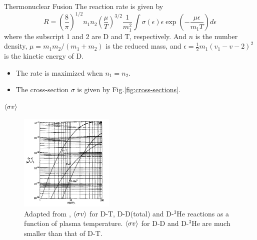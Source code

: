\begin{frame}{Thermonuclear Fusion}
	The reaction rate is given by
	\begin{equation}
		R = \left(\frac{8}{\pi}\right)^{1/2}n_1n_2\left(\frac{\mu}{T}\right)^{3/2}\frac{1}{m_1^2}\int \sigma(\epsilon)\epsilon\exp(-\frac{\mu\epsilon}{m_1T})d\epsilon
		\label{eq:reaction-rate}
	\end{equation}
	where the subscript 1 and 2 are D and T, respectively. And $n$ is the number density, $\mu=m_1m_2/(m_1+m_2)$ is the reduced mass, and $\epsilon=\frac{1}{2}m_1(v_1-v-2)^2$ is the kinetic energy of D.
	\begin{itemize}
		\item The rate is maximized when $n_1=n_2$.
		\item The cross-section $\sigma$ is given by Fig.\ref{fig:cross-sections}.
	\end{itemize}
\end{frame}

\begin{frame}{$\expval{\sigma v}$}
	\begin{figure}
		\centering
		\includegraphics[width=0.4\textwidth]{figures/sigma-v.png}
		\caption{Adapted from \cite{wesson_campbell_tokamaks_2011}, $\expval{\sigma v}$ for D-T, D-D(total) and D-$^3$He reactions as a function of plasma temperature. $\expval{\sigma v}$ for D-D and D-$^3$He are much smaller than that of D-T.}
		\label{fig:sigma-v}
	\end{figure}
\end{frame}
